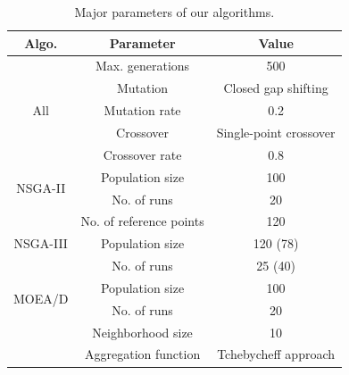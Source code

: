\begin{table}[!htbp]
	\centering
	\small
	\caption{Major parameters of our algorithms.}
	\begin{tabular}{|c|c|c|} %
		\hline
		Algo. & \multicolumn{1}{c|}{Parameter} & Value \\
		\hline
		\multirow{5}{*}{All} & Max. generations & 500 \\
		
		\cline{2-3}          & Mutation  & Closed gap shifting \\
		\cline{2-3}          & Mutation rate & 0.2 \\
		\cline{2-3}          & Crossover  & Single-point crossover \\
		\cline{2-3}          & Crossover rate & 0.8 \\ %
		\hline
		\multirow{2}{*}{NSGA-II} & Population size & 100 \\ %
		\cline{2-3}          & No. of runs & 20 \\
		\hline
		\multirow{3}{*}{NSGA-III} & No. of reference points & 120 \\
		\cline{2-3}          & Population size & 120 (78) \\ %
		\cline{2-3}          & No. of runs & 25 (40) \\
		\hline
		\multirow{2}{*}{MOEA/D} & Population size & 100 \\ %
		\cline{2-3}          & No. of runs & 20 \\
		\cline{2-3}          & Neighborhood size & 10 \\
		\cline{2-3}          & Aggregation function & Tchebycheff approach \\
		\hline
	\end{tabular}%
	\label{tab:parameters}%
\end{table}%

